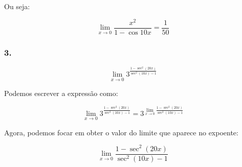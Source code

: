 \documentclass{article}
\begin{document}
Ou seja:

\[
    \lim_{x \to 0} \frac{x^2}{1 - \cos 10x}
    = \frac{1}{50}
\]


\subsubsection*{3.}

\[
    \lim_{x \to 0} 3^{\frac{1 - \sec^2(20x) }{\sec^2(10x) - 1}}
\]

Podemos escrever a expressão como:

\begin{equation} \label{question_3_expression}
    \lim_{x \to 0} 3^{\frac{1 - \sec^2(20x) }{\sec^2(10x) - 1}}
        = 3^{\lim_{x \to 0} \frac{1 - \sec^2(20x) }{\sec^2(10x) - 1} }
\end{equation}

Agora, podemos focar em obter o valor do limite que aparece no expoente:

\[
    \lim_{x \to 0} \frac{1 - \sec^2(20x) }{\sec^2(10x) - 1}
\]
\end{document}
